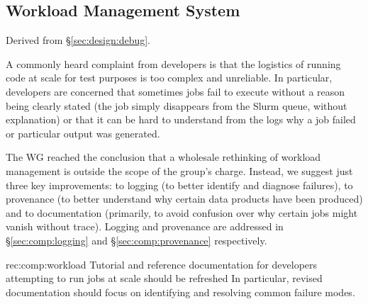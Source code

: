\subsection{Workload Management System}
\label{sec:comp:workload}

Derived from \S\ref{sec:design:debug}.

A commonly heard complaint from developers is that the logistics of running code at scale for test purposes is too complex and unreliable.
In particular, developers are concerned that sometimes jobs fail to execute without a reason being clearly stated (the job simply disappears from the Slurm queue, without explanation) or that it can be hard to understand from the logs why a job failed or particular output was generated.

The WG reached the conclusion that a wholesale rethinking of workload management is outside the scope of the group's charge.
Instead, we suggest just three key improvements: to logging (to better identify and diagnose failures), to provenance (to better understand why certain data products have been produced) and to documentation (primarily, to avoid confusion over why certain jobs might vanish without trace). Logging and provenance are addressed in \S\ref{sec:comp:logging} and \S\ref{sec:comp:provenance} respectively.

\begin{recommendation}
  {rec:comp:workload}
  {Tutorial and reference documentation for developers attempting to run jobs at scale should be refreshed}
  In particular, revised documentation should focus on identifying and resolving common failure modes.
\end{recommendation}
